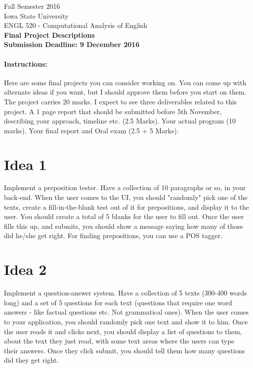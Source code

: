 \documentclass[11pt,a4paper]{article}
\begin{document}
\begin{center}
  Fall Semester 2016 \\ Iowa State University\\[3ex]
  {\large ENGL 520 - Computational Analysis of English}\\[3ex]
  \textbf{Final Project Descriptions} \\ \textbf{Submission Deadline: 9 December 2016}
\end{center}


\paragraph{Instructions:} Here are some final projects you can consider working on. You can come up with alternate ideas if you want, but I should approve them before you start on them. The project carries 20 marks. I expect to see three deliverables related to this project. A 1 page report that should be submitted before 5th November, describing your approach, timeline etc. (2.5 Marks). Your actual program (10 marks). Your final report and Oral exam (2.5 + 5 Marks).

\section*{Idea 1}
Implement a preposition tester. Have a collection of 10 paragraphs or so, in your back-end. When the user comes to the UI, you should "randomly" pick one of the texts, create a fill-in-the-blank test out of it for prepositions, and display it to the user. You should create a total of 5 blanks for the user to fill out. Once the user fills this up, and submits, you should show a message saying how many of those did he/she get right. For finding prepositions, you can use a POS tagger.

\section*{Idea 2}
Implement a question-answer system. Have a collection of 5 texts (300-400 words long) and a set of 5 questions for each text (questions that require one word answers - like factual questions etc. Not grammatical ones). When the user comes to your application, you should randomly pick one text and show it to him. Once the user reads it and clicks next, you should display a list of questions to them, about the text they just read, with some text areas where the users can type their answers. Once they click submit, you should tell them how many questions did they get right.
\end{document}
